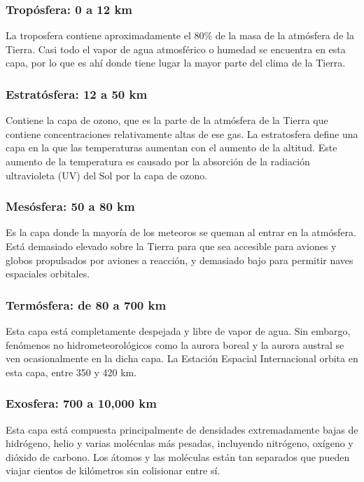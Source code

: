 \documentclass{article} %
\begin{document}
\subsubsection {Tropósfera: 0 a 12 km}
La troposfera contiene aproximadamente el 80\% de la masa de la atmósfera de la Tierra. Casi todo el vapor de agua atmosférico o humedad se encuentra en esta capa, por lo que es ahí donde tiene lugar la mayor parte del clima de la Tierra.

\subsubsection {Estratósfera: 12 a 50 km}
Contiene la capa de ozono, que es la parte de la atmósfera de la Tierra que contiene concentraciones relativamente altas de ese gas. La estratosfera define una capa en la que las temperaturas aumentan con el aumento de la altitud. Este aumento de la temperatura es causado por la absorción de la radiación ultravioleta (UV) del Sol por la capa de ozono.

\subsubsection {Mesósfera: 50 a 80 km}
Es la capa donde la mayoría de los meteoros se queman al entrar en la atmósfera. Está demasiado elevado sobre la Tierra para que sea accesible para aviones y globos propulsados por aviones a reacción, y demasiado bajo para permitir naves espaciales orbitales.

\subsubsection {Termósfera: de 80 a 700 km}
Esta capa está completamente despejada y libre de vapor de agua. Sin embargo, fenómenos no hidrometeorológicos como la aurora boreal y la aurora austral se ven ocasionalmente en la dicha capa. La Estación Espacial Internacional orbita en esta capa, entre 350 y 420 km.


\subsubsection {Exosfera: 700 a 10,000 km }
Esta capa está compuesta principalmente de densidades extremadamente bajas de hidrógeno, helio y varias moléculas más pesadas, incluyendo nitrógeno, oxígeno y dióxido de carbono. Los átomos y las moléculas están tan separados que pueden viajar cientos de kilómetros sin colisionar entre sí.
\end{document}
